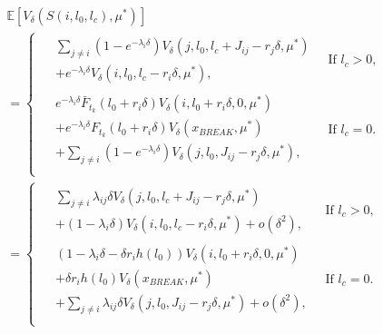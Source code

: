 \begin{equation}\label{eq:MmfmNextState}
\begin{split}
&\mathbb{E}[V_\delta(S(i,l_0,l_c),\mu^*)]\\
&=\begin{cases}
\begin{split}
&\sum\limits_{j\neq i}(1-e^{-\lambda_i \delta})V_\delta(j,l_0,l_c+J_{ij}-r_j\delta,\mu^*)\\
&+e^{-\lambda_i \delta}V_\delta(i,l_0,l_c-r_i\delta,\mu^*),
\end{split}&\ \text{If $l_c>0$,}\\
\begin{split}
&e^{-\lambda_i \delta} \bar{F}_{t_k}(l_0+r_i\delta)V_\delta(i,l_0+r_i\delta,0,\mu^*)\\
&+ e^{-\lambda_i \delta}F_{t_k}(l_0+r_i\delta)V_\delta(x_{BREAK},\mu^*)\\
&+\sum\limits_{j\neq i}(1-e^{-\lambda_i \delta})V_\delta(j,l_0,J_{ij}-r_j\delta,\mu^*),
\end{split}&\ \text{If $l_c=0$.}\\
\end{cases}\\
&=\begin{cases}
\begin{split}
&\sum\limits_{j\neq i}\lambda_{ij}\delta V_\delta(j,l_0,l_c+J_{ij}-r_j\delta,\mu^*)\\
&+(1-\lambda_i \delta)V_\delta(i,l_0,l_c-r_i\delta,\mu^*)+o(\delta^2),
\end{split}
&\ \text{If $l_c>0$,}\\
\begin{split}
&(1-\lambda_i \delta-\delta r_ih(l_0))V_\delta(i,l_0+r_i\delta,0,\mu^*)\\
&+ \delta r_ih(l_0)V_\delta(x_{BREAK},\mu^*)\\
&+\sum\limits_{j\neq i}\lambda_{ij} \delta V_\delta(j,l_0,J_{ij}-r_j\delta,\mu^*)+o(\delta^2),
\end{split}&\ \text{If $l_c=0$.}\\
\end{cases}
\end{split}
\end{equation}

